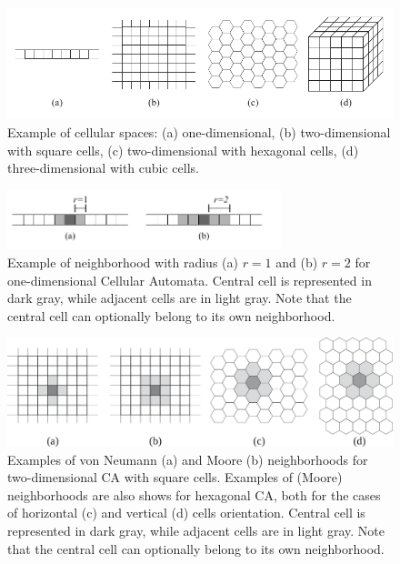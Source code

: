 \begin{figure}
  \begin{center}
    \includegraphics[width=12cm]{./images/CellularAutomata/cellularspaces.pdf}
    \caption{Example of cellular spaces: (a) one-dimensional, (b)
      two-dimensional with square cells, (c) two-dimensional with
      hexagonal cells, (d) three-dimensional with cubic cells.}
    \label{fig:cellularspaces}
  \end{center}
\end{figure}

\begin{figure}
  \begin{center}
    \includegraphics[width=8cm]{./images/CellularAutomata/onedimensional.pdf}
    \caption{Example of neighborhood with radius (a) $r = 1$ and (b) $r
      = 2$ for one-dimensional Cellular Automata. Central cell is
      represented in dark gray, while adjacent cells are in light
      gray. Note that the central cell can optionally belong to its own
      neighborhood.}
    \label{fig:1Dneighborhood}
  \end{center}
\end{figure}

\begin{figure}
  \begin{center}
    \includegraphics[width=12cm]{./images/CellularAutomata/2Dneighborhoods.png}
    \caption{Examples of von Neumann (a) and Moore (b) neighborhoods
      for two-dimensional CA with square cells. Examples of (Moore)
      neighborhoods are also shows for hexagonal CA, both for the
      cases of horizontal (c) and vertical (d) cells
      orientation. Central cell is represented in dark gray, while
      adjacent cells are in light gray. Note that the central cell can
      optionally belong to its own neighborhood.}
    \label{fig:2Dneighborhood}
  \end{center}
\end{figure}



